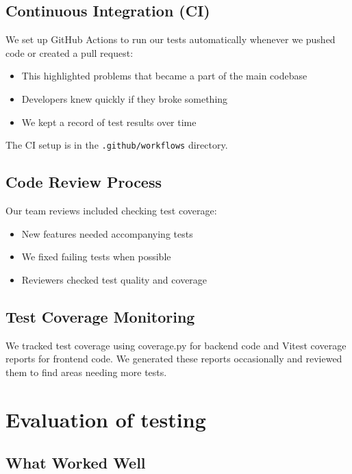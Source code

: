 \subsection{Continuous Integration (CI)}

We set up GitHub Actions to run our tests automatically whenever we pushed code or created a pull request:

\begin{itemize}
    \item This highlighted problems that became a part of the main codebase
    \item Developers knew quickly if they broke something
    \item We kept a record of test results over time
\end{itemize}

The CI setup is in the \texttt{.github/workflows} directory.

\subsection{Code Review Process}

Our team reviews included checking test coverage:

\begin{itemize}
    \item New features needed accompanying tests
    \item We fixed failing tests when possible
    \item Reviewers checked test quality and coverage
\end{itemize}

\subsection{Test Coverage Monitoring}

We tracked test coverage using coverage.py for backend code and Vitest coverage reports for frontend code. We generated these reports occasionally and reviewed them to find areas needing more tests.

\section{Evaluation of testing}
\label{sect:testing:evaluation}

\subsection{What Worked Well}

